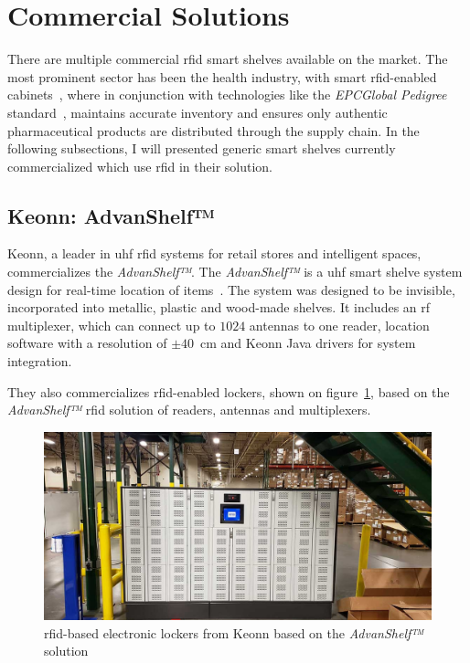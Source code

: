 \section{Commercial Solutions} \label{sec:commercialsolutions}

There are multiple commercial \ac{rfid} smart shelves available on the market.
The most prominent sector has been the health industry, with smart \ac{rfid}-enabled cabinets~\cite{RFIDSmartCabinets, RFIDTechnologyCabinet, DyaneSmartCabinetSmart,RFIDEnabledCabinetry}, where in conjunction with technologies like the \emph{EPCGlobal Pedigree} standard~\cite{PedigreeStandardV1}, maintains accurate inventory and ensures only authentic pharmaceutical products are distributed through the supply chain.
In the following subsections, I will presented generic smart shelves currently commercialized which use \ac{rfid} in their solution.

\subsection{Keonn: AdvanShelf™} \label{sec:keonnsolutions}

Keonn, a leader in \ac{uhf} \ac{rfid} systems for retail stores and intelligent spaces, commercializes the \emph{AdvanShelf™}.
The \emph{AdvanShelf™} is a \ac{uhf} smart shelve system design for real-time location of items~\cite{AdvanShelfRFIDSmart}.
The system was designed to be invisible, incorporated into metallic, plastic and wood-made shelves.
It includes an \ac{rf} multiplexer, which can connect up to $1024$ antennas to one reader, location software with a resolution of $\pm40$~cm and Keonn Java drivers for system integration.

They also commercializes \ac{rfid}-enabled lockers, shown on figure~\ref{fig:keonnlocker}, based on the \emph{AdvanShelf™} \ac{rfid} solution of readers, antennas and multiplexers.

\begin{figure}[!ht]
    \centering
    \includegraphics[width=1\textwidth]{./figs/02-state-of-the-art/keonn_lockers.jpg}
    \caption[\ac{rfid}-based electronic lockers from Keonn]{\ac{rfid}-based electronic lockers from Keonn based on the \emph{AdvanShelf™} solution~\cite{RFIDenabledLockersProvide}} 
    \label{fig:keonnlocker}
\end{figure}

